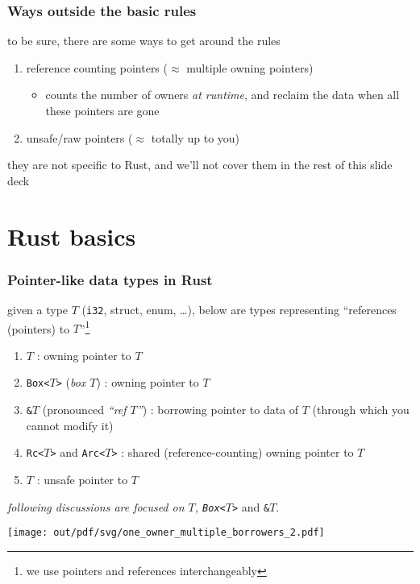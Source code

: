 \documentclass[12pt,dvipdfmx]{beamer}
\newcommand{\mura}[1]{{\color{purple}#1}}
\newcommand{\ore}[1]{{\color{orange}#1}}
\newcommand{\ao}[1]{{\color{blue}#1}}
\begin{document}
\begin{frame}
  \frametitle{Ways outside the basic rules}
  to be sure, there are some ways to get around the rules
  \begin{enumerate}
  \item \ore{reference counting pointers} ($\approx$ multiple owning pointers)
    \begin{itemize}
    \item counts the number of owners {\it at runtime},
      and reclaim the data when all these pointers are gone
    \end{itemize}
  \item \ore{unsafe/raw pointers} ($\approx$ totally up to you)
  \end{enumerate}
  they are not specific to Rust,
  and we'll not cover them in the rest of this slide deck
\end{frame}

\section{Rust basics}
\begin{frame}
  \frametitle{Pointer-like data types in Rust}
  given a type $T$ ({\tt i32}, struct, enum, \ldots), below are
  types representing ``references (pointers) to $T$''\footnote{we use
    pointers and references interchangeably}
  \begin{enumerate}
  \item \mura{\tt $T$} : \mura{owning} pointer to $T$
  \item \mura{\tt Box<$T$>} ({\it box $T$}) : \mura{owning} pointer to $T$
  \item \ao{\tt \&$T$} (pronounced {\it ``ref $T$''}) : 
    \ao{borrowing pointer} to data of $T$ (through which you cannot modify it)
  \item \ore{\tt Rc<$T$>} and \ore{\tt Arc<$T$>} : 
    shared (reference-counting) owning pointer to $T$
  \item \ore{\tt *$T$} : unsafe pointer to $T$
  \end{enumerate}

  {\it following discussions are focused on
    \mura{$T$},  \mura{\tt Box<$T$>}} and \ao{\tt \&$T$}.

  \begin{center}
    \texttt{[image: out/pdf/svg/one\_owner\_multiple\_borrowers\_2.pdf]}
  \end{center}
\end{frame}
\end{document}
